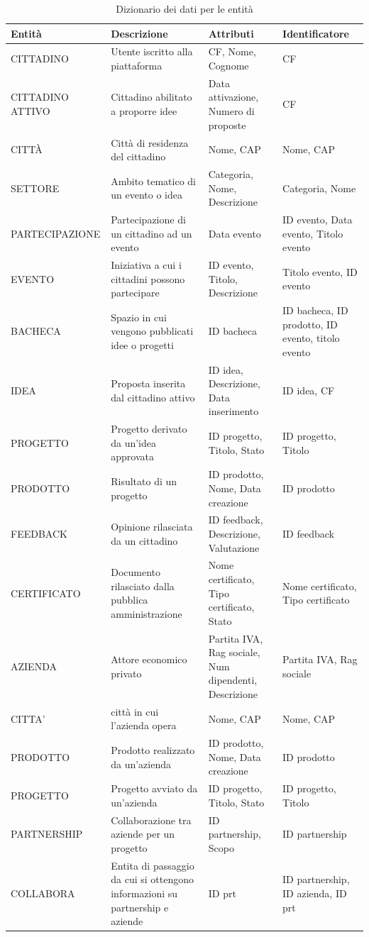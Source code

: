 \documentclass{article}
\begin{document}
 \begin{table}[h!]
    \centering
    \begin{tabular}{|l|p{4cm}|p{6cm}|p{3cm}|}
    \hline
    \textbf{Entità} & \textbf{Descrizione} & \textbf{Attributi} & \textbf{Identificatore} \\
    \hline
    CITTADINO & Utente iscritto alla piattaforma & CF, Nome, Cognome & CF \\
    \hline
    CITTADINO ATTIVO & Cittadino abilitato a proporre idee & Data attivazione, Numero di proposte & CF \\
    \hline
    CITTÀ & Città di residenza del cittadino & Nome, CAP & Nome, CAP \\
    \hline
    SETTORE & Ambito tematico di un evento o idea & Categoria, Nome, Descrizione & Categoria, Nome \\
    \hline
    PARTECIPAZIONE & Partecipazione di un cittadino ad un evento & Data evento & ID evento, Data evento, Titolo evento \\
    \hline
    EVENTO & Iniziativa a cui i cittadini possono partecipare & ID evento, Titolo, Descrizione & Titolo evento, ID evento \\
    \hline
    BACHECA & Spazio in cui vengono pubblicati idee o progetti & ID bacheca & ID bacheca, ID prodotto, ID evento, titolo evento \\
    \hline
    IDEA & Proposta inserita dal cittadino attivo & ID idea, Descrizione, Data inserimento & ID idea, CF\\
    \hline
    PROGETTO & Progetto derivato da un'idea approvata & ID progetto, Titolo, Stato & ID progetto, Titolo \\
    \hline
    PRODOTTO & Risultato di un progetto & ID prodotto, Nome, Data creazione & ID prodotto \\
    \hline
    FEEDBACK & Opinione rilasciata da un cittadino & ID feedback, Descrizione, Valutazione & ID feedback \\
    \hline
    CERTIFICATO & Documento rilasciato dalla pubblica amministrazione & Nome certificato, Tipo certificato, Stato & Nome certificato, Tipo certificato \\
    \hline
    AZIENDA & Attore economico privato & Partita IVA, Rag sociale, Num dipendenti, Descrizione & Partita IVA, Rag sociale \\
    \hline
    CITTA' & città in cui l'azienda opera & Nome, CAP & Nome, CAP \\
    \hline
    PRODOTTO & Prodotto realizzato da un'azienda & ID prodotto, Nome, Data creazione & ID prodotto \\
    \hline
    PROGETTO & Progetto avviato da un'azienda & ID progetto, Titolo, Stato & ID progetto, Titolo \\
    \hline
    PARTNERSHIP & Collaborazione tra aziende per un progetto & ID partnership, Scopo & ID partnership \\
    \hline
    COLLABORA & Entita di passaggio da cui si ottengono informazioni su partnership e aziende & ID prt & ID partnership, ID azienda, ID prt \\
    \hline
    \end{tabular}
    \caption{Dizionario dei dati per le entità}
\end{table}
\end{document}

